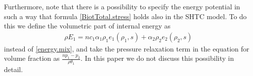 \documentclass[3p,times,table]{article}
\newcommand{\pf}{p_{\rm f}}
\newcommand{\ps}{p_{\rm s}}
\newcommand{\alphaf}{\alpha_{\rm f}}
\newcommand{\alphas}{\alpha_{\rm s}}
\begin{document}
Furthermore, note that there is a possibility to specify the energy 
potential in such a way that 
formula \eqref{BiotTotal.stress} 
holds also in the SHTC model.
To do this we define the volumetric part of internal energy 
as
\begin{align*} 
\rho E_1=n c_1 \alpha_1 \rho_1e_1(\rho_1,s)+\alpha_2 \rho_2 e_2(\rho_2,s) 
\end{align*}
instead of \eqref{energy.mix},
and take the pressure relaxation term in the equation for volume fraction as
$\frac{ n p_1-p_2}{\rho \theta_1}$. In this paper we do not discuss this 
possibility in detail. 

\end{document}
